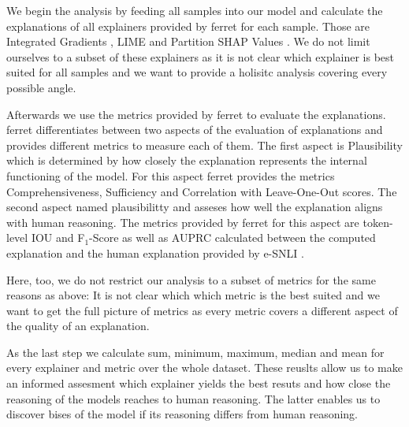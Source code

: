 We begin the analysis by feeding all samples into our model and calculate the explanations of all explainers provided by ferret \cite{ferret} for each sample. Those are Integrated Gradients \cite{integratedgradients}, \ac{LIME} \cite{lime} and Partition SHAP Values \cite{shap}. We do not limit ourselves to a subset of these explainers as it is not clear which explainer is best suited for all samples and we want to provide a holisitc analysis covering every possible angle. 

Afterwards we use the metrics provided by ferret to evaluate the explanations. ferret differentiates between two aspects of the evaluation of explanations and provides different metrics to measure each of them. The first aspect is Plausibility which is determined by how closely the explanation represents the internal functioning of the model. For this aspect ferret provides the metrics Comprehensiveness, Sufficiency and Correlation with Leave-One-Out scores. The second aspect named plausibilitty and asseses how well the explanation aligns with human reasoning. The metrics provided by ferret for this aspect are token-level \ac{IOU} and F$_1$-Score as well as \ac{AUPRC} calculated between the computed explanation and the human explanation provided by \ac{e-SNLI} \cite{ferret}.

Here, too, we do not restrict our analysis to a subset of metrics for the same reasons as above: It is not clear which which metric is the best suited and we want to get the full picture of metrics as every metric covers a different aspect of the quality of an explanation.

As the last step we calculate sum, minimum, maximum, median and mean for every explainer and metric over the whole dataset. These reuslts allow us to make an informed assesment which explainer yields the best resuts and how close the reasoning of the models reaches to human reasoning. The latter enables us to discover bises of the model if its reasoning differs from human reasoning.